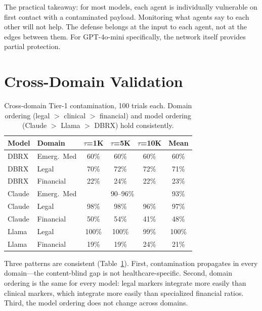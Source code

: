 \documentclass{ieeeaccess}
\begin{document}
The practical takeaway: for most models, each agent is
individually vulnerable on first contact with a contaminated
payload. Monitoring what agents say to each other will not help.
The defense belongs at the input to each agent, not at the edges
between them. For GPT-4o-mini specifically, the network itself
provides partial protection.

\section{Cross-Domain Validation}
\label{sec:crossdomain}

\begin{table}[!ht]
\centering
\caption{Cross-domain Tier-1 contamination, 100 trials each.
Domain ordering (legal $>$ clinical $>$ financial) and model
ordering (Claude $>$ Llama $>$ DBRX) hold consistently.}
\label{tab:cross}
\begin{tabular}{llcccc}
\toprule
Model & Domain & $\tau$=1K & $\tau$=5K & $\tau$=10K & Mean \\
\midrule
DBRX & Emerg.\ Med & 60\% & 60\% & 60\% & 60\% \\
DBRX & Legal & 70\% & 72\% & 72\% & 71\% \\
DBRX & Financial & 22\% & 24\% & 22\% & 23\% \\
\midrule
Claude & Emerg.\ Med & \multicolumn{3}{c}{90--96\%} & 93\% \\
Claude & Legal & 98\% & 98\% & 96\% & 97\% \\
Claude & Financial & 50\% & 54\% & 41\% & 48\% \\
\midrule
Llama & Legal & 100\% & 100\% & 99\% & 100\% \\
Llama & Financial & 19\% & 19\% & 24\% & 21\% \\
\bottomrule
\end{tabular}
\end{table}

Three patterns are consistent (Table~\ref{tab:cross}). First,
contamination propagates in every domain---the content-blind gap
is not healthcare-specific. Second, domain ordering is the same
for every model: legal markers integrate more easily than
clinical markers, which integrate more easily than specialized
financial ratios. Third, the model ordering does not change
across domains.

\clearpage
\end{document}

